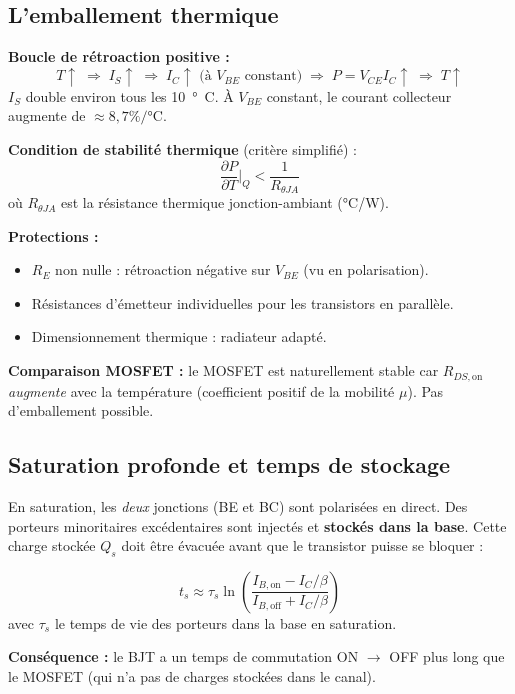 \documentclass[12pt,a4paper,twoside]{book}
\begin{document}
\subsection{L'emballement thermique}

\begin{attention}
\textbf{Boucle de rétroaction positive :}
\[
T \uparrow \;\Rightarrow\; I_S \uparrow \;\Rightarrow\; I_C \uparrow \text{ (à $V_{BE}$ constant)} \;\Rightarrow\; P = V_{CE}I_C \uparrow \;\Rightarrow\; T \uparrow
\]
$I_S$ double environ tous les \SI{10}{°C}. À $V_{BE}$ constant, le courant collecteur augmente de $\approx 8{,}7\%/°$C.

\textbf{Condition de stabilité thermique} (critère simplifié) :
\[
\frac{\partial P}{\partial T}\bigg|_Q < \frac{1}{R_{\theta JA}}
\]
où $R_{\theta JA}$ est la résistance thermique jonction-ambiant (°C/W).

\textbf{Protections :}
\begin{itemize}[nosep]
\item $R_E$ non nulle : rétroaction négative sur $V_{BE}$ (vu en polarisation).
\item Résistances d'émetteur individuelles pour les transistors en parallèle.
\item Dimensionnement thermique : radiateur adapté.
\end{itemize}

\textbf{Comparaison MOSFET :} le MOSFET est naturellement stable car $R_{DS,\text{on}}$ \textit{augmente} avec la température (coefficient positif de la mobilité $\mu$). Pas d'emballement possible.
\end{attention}

\subsection{Saturation profonde et temps de stockage}

En saturation, les \textit{deux} jonctions (BE et BC) sont polarisées en direct. Des porteurs minoritaires excédentaires sont injectés et \textbf{stockés dans la base}. Cette charge stockée $Q_s$ doit être évacuée avant que le transistor puisse se bloquer :

\begin{formule}
\[
t_s \approx \tau_s \ln\left(\frac{I_{B,\text{on}} - I_{C}/\beta}{I_{B,\text{off}} + I_C/\beta}\right)
\]
avec $\tau_s$ le temps de vie des porteurs dans la base en saturation.

\textbf{Conséquence :} le BJT a un temps de commutation ON $\to$ OFF plus long que le MOSFET (qui n'a pas de charges stockées dans le canal).
\end{formule}
\end{document}
